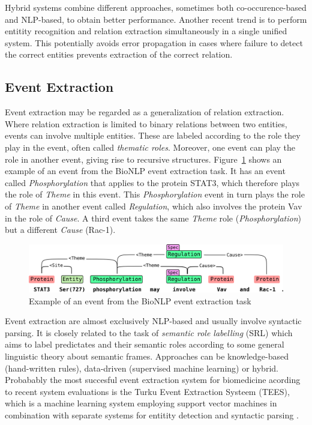 Hybrid systems combine different approaches, sometimes both co-occurence-based and NLP-based, to obtain better performance.
Another recent trend is to perform entitity recognition and relation extraction simultaneously in a single unified system.
This potentially avoids error propagation in cases where failure to detect the correct entities prevents extraction of the correct relation.
  
\subsection{Event Extraction}

Event extraction may be regarded as a generalization of relation extraction.
Where relation extraction is limited to binary relations between two entities, events can involve multiple entities.
These are labeled according to the role they play in the event, often called \emph{thematic roles}.
Moreover, one event can play the role in another event, giving rise to recursive structures.
Figure~\ref{fig:event-example} shows an example of an event from the BioNLP event extraction task.
It has an event called \emph{Phosphorylation} that applies to the protein STAT3, which therefore plays the role of \emph{Theme} in this event.
This \emph{Phosphorylation} event in turn plays the role of \emph{Theme} in another event called \emph{Regulation}, which also involves the protein Vav in the role of \emph{Cause}.
A third event takes the same \emph{Theme} role (\emph{Phosphorylation}) but a different \emph{Cause} (Rac-1).

\begin{figure}
\begin{center}
\includegraphics[scale=0.65]{figures/event-example.png}
 \caption{Example of an event from the BioNLP event extraction task \citep{Bjorne2011EXTRACTING}}
\label{fig:event-example}
\end{center}
\end{figure}

Event extraction are almost exclusively NLP-based and usually involve syntactic parsing.
It is closely related to the task of \emph{semantic role labelling} (SRL) which aims to label predictates and their semantic roles according to some general linguistic theory about semantic frames. 
Approaches can be knowledge-based (hand-written rules), data-driven (supervised machine learning) or hybrid.
Probabably the most succesful event extraction system for biomedicine acording to recent system evaluations is the Turku Event Extraction Systeem (TEES), which is a machine learning system employing support vector machines in combination with separate systems for entitity detection and syntactic parsing \citep{Bjorne2011EXTRACTING}. 


